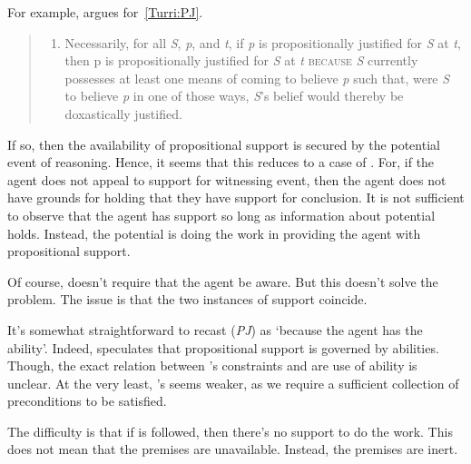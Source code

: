 \begin{note}
  For example, \citeauthor{Turri:2010aa} argues for~\ref{Turri:PJ}.
  \begin{quote}
    \begin{enumerate}[label=(\textbf{PJ}), ref=(\textbf{PJ})]
    \item\label{Turri:PJ} Necessarily, for all \emph{S}, \emph{p}, and \emph{t}, if \emph{p} is propositionally justified for \emph{S} at \emph{t}, then p\emph{} is propositionally justified for \emph{S} at \emph{t} \textsc{because} \emph{S} currently possesses at least one means of coming to believe \emph{p} such that, were \emph{S} to believe \emph{p} in one of those ways, \emph{S}'s belief would thereby be doxastically justified.
    \end{enumerate}
  \end{quote}
  If so, then the availability of propositional support is secured by the potential event of reasoning.
  Hence, it seems that this reduces to a case of \AR{}.
  For, if the agent does not appeal to support for witnessing event, then the agent does not have grounds for holding that they have support for conclusion.
  It is not sufficient to observe that the agent has support so long as information about potential holds.
  Instead, the potential is doing the work in providing the agent with propositional support.

  Of course, \citeauthor{Turri:2010aa} doesn't require that the agent be aware.
  But this doesn't solve the problem.
  The issue is that the two instances of support coincide.

  It's somewhat straightforward to recast (\emph{PJ}) as `because the agent has the ability'.
  Indeed, \citeauthor{Turri:2010aa} speculates that propositional support is governed by abilities.
  Though, the exact relation between \citeauthor{Turri:2010aa}'s constraints and are use of ability is unclear.
  At the very least, \citeauthor{Turri:2010aa}'s seems weaker, as we require a sufficient collection of preconditions to be satisfied.
\end{note}

\begin{note}[Note]
  The difficulty is that if \citeauthor{Turri:2010aa} is followed, then there's no support to do the work.
  This does not mean that the premises are unavailable.
  Instead, the premises are inert.
\end{note}

